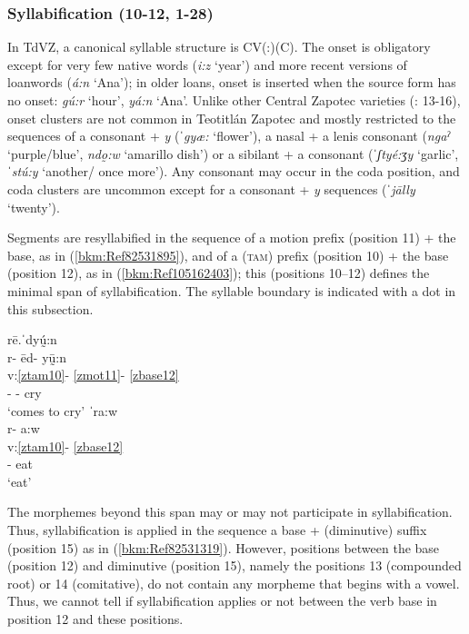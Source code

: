 \documentclass[output=paper]{langscibook}
\begin{document}
\subsubsection{Syllabification (10-12, 1-28)}

In TdVZ, a canonical syllable structure is CV(:)(C). The onset is obligatory except for very few native words (\textit{i:z} `year') and more recent versions of loanwords (\textit{á:n} `Ana'); in older loans, onset is inserted when the source form has no onset: \textit{gú:r} `hour', \textit{yá:n} `Ana'. Unlike other Central Zapotec varieties (\citealt{Chavez-Peon2010}: 13-16), onset clusters are not common in Teotitlán Zapotec and mostly restricted to the sequences of a consonant + \textit{y} (ˈ\textit{gyæ:} `flower'), a nasal + a lenis consonant (\textit{ngaˀ} `purple/blue', \textit{ndo̰:w} `amarillo dish') or a sibilant + a consonant (ˈ\textit{ʃtyé:ʒy} `garlic', \textit{ˈstú:y} `another/ once more'). Any consonant may occur in the coda position, and coda clusters are uncommon except for a consonant + \textit{y} sequences (ˈ\textit{jālly} `twenty'). 

Segments are resyllabified in the sequence of a motion prefix (position 11) + the base, as in (\ref{bkm:Ref82531895}), and of a (\textsc{tam}) prefix (position 10) + the base (position 12), as in (\ref{bkm:Ref105162403}); this (positions 10--12) defines the minimal span of syllabification. The syllable boundary is indicated with a dot in this subsection.

\ea\label{bkm:Ref82531895}
{rē.ˈdyṵ́:n}\\
\glll r- ēd- yṵ̄:n\\
    v:\ref{ztam10}- \ref{zmot11}- \ref{zbase12} \\
   \Hab{}- \Ven{}- cry\\
\glt `comes to cry'
\ex\label{bkm:Ref105162403}
{ˈra:w}\\
\glll r- a:w\\
v:\ref{ztam10}- \ref{zbase12} \\
\Hab{}- eat\\
\glt `eat'
\z

The morphemes beyond this span may or may not participate in syllabification. Thus, syllabification is applied in the sequence a base + (diminutive) suffix (position 15) as in (\ref{bkm:Ref82531319}). However, positions between the base (position 12) and diminutive (position 15), namely the positions 13 (compounded root) or 14 (comitative), do not contain any morpheme that begins with a vowel. Thus, we cannot tell if syllabification applies or not between the verb base in position 12 and these positions.
\end{document}
